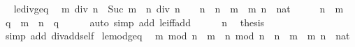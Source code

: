 \begin{isabellebody}
{\isafoldproof}%
%
\isadelimproof
\ \isanewline
%
\endisadelimproof
\isanewline
{}\isamarkupfalse%
\ le{\isacharunderscore}{\kern0pt}div{\isacharunderscore}{\kern0pt}geq{\isacharcolon}{\kern0pt}\isanewline
\ \ {\isachardoublequoteopen}m\ div\ n\ {\isacharequal}{\kern0pt}\ Suc\ {\isacharparenleft}{\kern0pt}{\isacharparenleft}{\kern0pt}m\ {\isacharminus}{\kern0pt}\ n{\isacharparenright}{\kern0pt}\ div\ n{\isacharparenright}{\kern0pt}{\isachardoublequoteclose}\ \ {\isachardoublequoteopen}{}\ {\isacharless}{\kern0pt}\ n{\isachardoublequoteclose}\ \ {\isachardoublequoteopen}n\ {\isasymle}\ m{\isachardoublequoteclose}\ \ m\ n\ {\isacharcolon}{\kern0pt}{\isacharcolon}{\kern0pt}\ nat\isanewline
%
\isadelimproof
%
\endisadelimproof
%
\isatagproof
{}\isamarkupfalse%
\ {\isacharminus}{\kern0pt}\isanewline
\ \ \isamarkupfalse%
\ {\isacartoucheopen}n\ {\isasymle}\ m{\isacartoucheclose}\ \isamarkupfalse%
\ q\ \ {\isachardoublequoteopen}m\ {\isacharequal}{\kern0pt}\ n\ {\isacharplus}{\kern0pt}\ q{\isachardoublequoteclose}\isanewline
\ \ \ \ \isamarkupfalse%
\ {\isacharparenleft}{\kern0pt}auto\ simp\ add{\isacharcolon}{\kern0pt}\ le{\isacharunderscore}{\kern0pt}iff{\isacharunderscore}{\kern0pt}add{\isacharparenright}{\kern0pt}\isanewline
\ \ \isamarkupfalse%
\ {\isacartoucheopen}{}\ {\isacharless}{\kern0pt}\ n{\isacartoucheclose}\ \isamarkupfalse%
\ {\isacharquery}{\kern0pt}thesis\isanewline
\ \ \ \ \isamarkupfalse%
\ {\isacharparenleft}{\kern0pt}simp\ add{\isacharcolon}{\kern0pt}\ div{\isacharunderscore}{\kern0pt}add{\isacharunderscore}{\kern0pt}self{}{\isacharparenright}{\kern0pt}\isanewline
{}\isamarkupfalse%
%
\endisatagproof
{\isafoldproof}%
%
\isadelimproof
\isanewline
%
\endisadelimproof
\isanewline
{}\isamarkupfalse%
\ le{\isacharunderscore}{\kern0pt}mod{\isacharunderscore}{\kern0pt}geq{\isacharcolon}{\kern0pt}\isanewline
\ \ {\isachardoublequoteopen}m\ mod\ n\ {\isacharequal}{\kern0pt}\ {\isacharparenleft}{\kern0pt}m\ {\isacharminus}{\kern0pt}\ n{\isacharparenright}{\kern0pt}\ mod\ n{\isachardoublequoteclose}\ \ {\isachardoublequoteopen}n\ {\isasymle}\ m{\isachardoublequoteclose}\ \ m\ n\ {\isacharcolon}{\kern0pt}{\isacharcolon}{\kern0pt}\ nat\isanewline
%
\isadelimproof
%
\endisadelimproof
%
\isatagproof
{}\isamarkupfalse%
\ {\isacharminus}{\kern0pt}\isanewline

\end{isabellebody}
